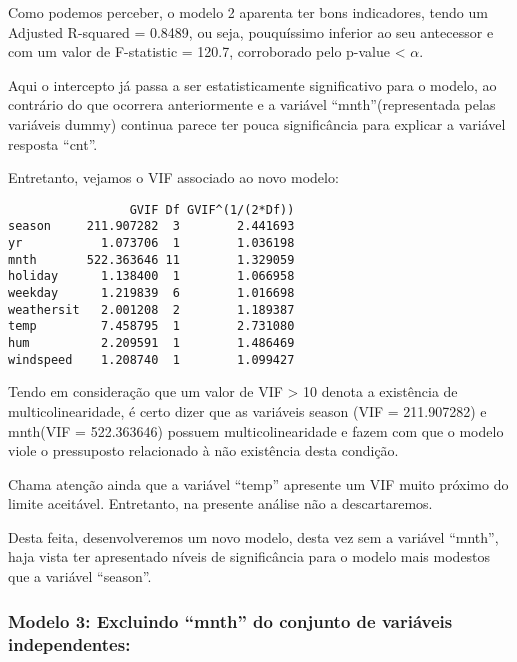 \documentclass[
  letterpaper,
  DIV=11,
  numbers=noendperiod]{scrartcl}
\begin{document}
Como podemos perceber, o modelo 2 aparenta ter bons indicadores, tendo
um Adjusted R-squared = 0.8489, ou seja, pouquíssimo inferior ao seu
antecessor e com um valor de F-statistic = 120.7, corroborado pelo
p-value \textless{} \(\alpha\).

Aqui o intercepto já passa a ser estatisticamente significativo para o
modelo, ao contrário do que ocorrera anteriormente e a variável
``mnth''(representada pelas variáveis dummy) continua parece ter pouca
significância para explicar a variável resposta ``cnt''.

Entretanto, vejamos o VIF associado ao novo modelo:

\begin{verbatim}
                 GVIF Df GVIF^(1/(2*Df))
season     211.907282  3        2.441693
yr           1.073706  1        1.036198
mnth       522.363646 11        1.329059
holiday      1.138400  1        1.066958
weekday      1.219839  6        1.016698
weathersit   2.001208  2        1.189387
temp         7.458795  1        2.731080
hum          2.209591  1        1.486469
windspeed    1.208740  1        1.099427
\end{verbatim}

Tendo em consideração que um valor de VIF \textgreater{} 10 denota a
existência de multicolinearidade, é certo dizer que as variáveis season
(VIF = 211.907282) e mnth(VIF = 522.363646) possuem multicolinearidade e
fazem com que o modelo viole o pressuposto relacionado à não existência
desta condição.

Chama atenção ainda que a variável ``temp'' apresente um VIF muito
próximo do limite aceitável. Entretanto, na presente análise não a
descartaremos.

Desta feita, desenvolveremos um novo modelo, desta vez sem a variável
``mnth'', haja vista ter apresentado níveis de significância para o
modelo mais modestos que a variável ``season''.

\subsubsection{\texorpdfstring{\textbf{Modelo 3: Excluindo ``mnth'' do
conjunto de variáveis
independentes:}}{Modelo 3: Excluindo ``mnth'' do conjunto de variáveis independentes:}}\label{modelo-3-excluindo-mnth-do-conjunto-de-variuxe1veis-independentes}
\end{document}
